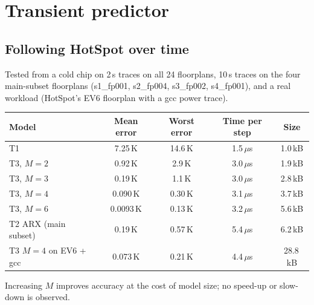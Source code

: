 \documentclass[11pt,a4paper]{article}
\newcommand{\us}{\,$\mu$s}
\begin{document}
\section{Transient predictor}

\subsection{Following HotSpot over time}
Tested from a cold chip on 2\,s traces on all 24 floorplans, 10\,s traces on the four main-subset
floorplans (s1\_fp001, s2\_fp004, s3\_fp002, s4\_fp001), and a real workload (HotSpot's EV6
floorplan with a gcc power trace).

\begin{center}
\small
\begin{tabular}{@{}l c c c c@{}}
\toprule
Model & Mean error & Worst error & Time per step & Size \\
\midrule
T1 & 7.25\,K & 14.6\,K & 1.5\us & 1.0\,kB \\
T3, $M=2$ & 0.92\,K & 2.9\,K & 3.0\us & 1.9\,kB \\
T3, $M=3$ & 0.19\,K & 1.1\,K & 3.0\us & 2.8\,kB \\
T3, $M=4$ & 0.090\,K & 0.30\,K & 3.1\us & 3.7\,kB \\
T3, $M=6$ & 0.0093\,K & 0.13\,K & 3.2\us & 5.6\,kB \\
T2 ARX (main subset) & 0.19\,K & 0.57\,K & 5.4\us & 6.2\,kB \\
T3 $M=4$ on EV6 + gcc & 0.073\,K & 0.21\,K & 4.4\us & 28.8\,kB \\
\bottomrule
\end{tabular}
\end{center}
Increasing $M$ improves accuracy at the cost of model size; no speed-up or slow-down is observed.
\end{document}
